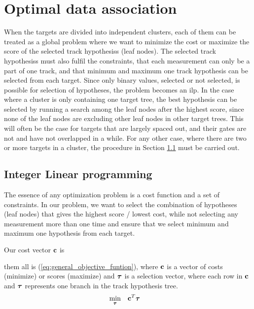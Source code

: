\section{Optimal data association}
When the targets are divided into independent clusters, each of them can be treated as a global problem where we want to minimize the cost or maximize the score of the selected \glspl{track hypothesis} (leaf nodes). The selected \glspl{track hypothesis} must also fulfil the constraints, that each measurement can only be a part of one track, and that minimum and maximum one track hypothesis can be selected from each target. Since only binary values, selected or not selected, is possible for selection of hypotheses, the problem becomes an \gls{ilp}. In the case where a cluster is only containing one target tree, the best hypothesis can be selected by running a search among the leaf nodes after the highest score, since none of the leaf nodes are excluding other leaf nodes in other target trees. This will often be the case for targets that are largely spaced out, and their gates are not and have not overlapped in a while. For any other case, where there are two or more targets in a cluster, the procedure in Section \ref{subsec:integer_linear_programming} must be carried out. 

\subsection{Integer Linear programming}\label{subsec:integer_linear_programming}
The essence of any optimization problem is a cost function and a set of constraints. In our problem, we want to select the combination of hypotheses (leaf nodes) that gives the highest score / lowest cost, while not selecting any measurement more than one time and ensure that we select minimum and maximum one hypothesis from each target.



Our cost vector \(\boldsymbol{\mathbf{c}}\) is 

 them all is (\ref{eq:general_objective_funtion}), where $\boldsymbol{\mathbf{c}}$ is a vector of costs (minimize) or scores (maximize) and $\boldsymbol{\mathbf{\tau}}$ is a selection vector, where each row in $\boldsymbol{\mathbf{c}}$ and $\boldsymbol{\mathbf{\tau}}$ represents one branch in the track hypothesis tree.
\begin{equation}
\begin{aligned}
& \underset{\boldsymbol{\mathbf{\tau}}}{\text{min}}
& & \boldsymbol{\mathbf{c}}^T \boldsymbol{\mathbf{\tau}}
\end{aligned}
\label{eq:general_objective_funtion}
\end{equation}

